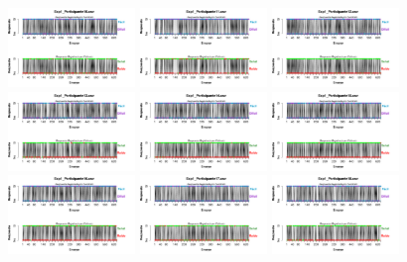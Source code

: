 \begin{figure}[th]
\includegraphics[width=0.30\textwidth]{Figures/BiasResp_Exp1_P10} \includegraphics[width=0.30\textwidth]{Figures/BiasResp_Exp1_P11} \includegraphics[width=0.30\textwidth]{Figures/BiasResp_Exp1_P12}
\includegraphics[width=0.30\textwidth]{Figures/BiasResp_Exp1_P13} \includegraphics[width=0.30\textwidth]{Figures/BiasResp_Exp1_P14} \includegraphics[width=0.30\textwidth]{Figures/BiasResp_Exp1_P15}
\includegraphics[width=0.30\textwidth]{Figures/BiasResp_Exp1_P16} \includegraphics[width=0.30\textwidth]{Figures/BiasResp_Exp1_P17} \includegraphics[width=0.30\textwidth]{Figures/BiasResp_Exp1_P18}

\end{figure}
